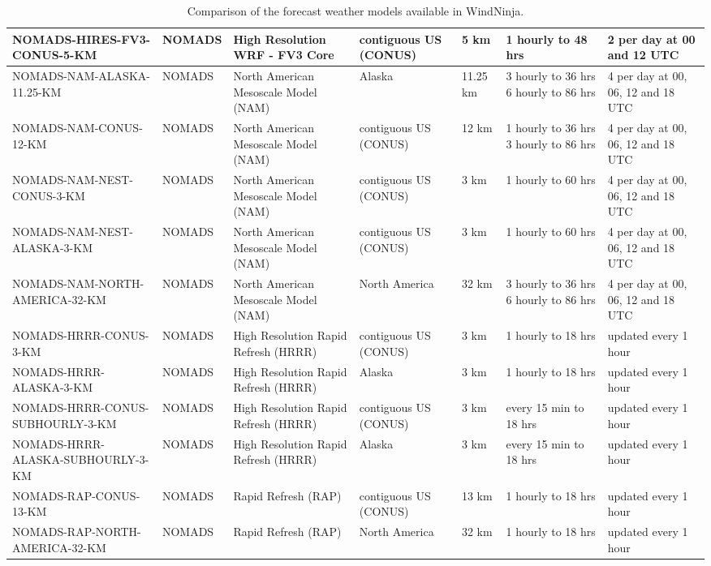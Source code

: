 \documentclass[12pt]{article}
\begin{document}
\begin{landscape}
\begin{table}
\begin{tabular}{|p{6.6cm}|p{1.3cm}|p{3.3cm}|p{2cm}|p{1.7cm}|p{2.8cm}|p{2.8cm}|}
\hline
NOMADS-HIRES-FV3-CONUS-5-KM & NOMADS & High Resolution WRF - FV3 Core & contiguous US (CONUS) & 5 km & 1 hourly to 48 hrs & 2 per day at 00 and 12 UTC\\
\hline
NOMADS-NAM-ALASKA-11.25-KM & NOMADS & North American Mesoscale Model (NAM) & Alaska & 11.25 km & 3 hourly to 36 hrs 6 hourly to 86 hrs & 4 per day at 00, 06, 12 and 18 UTC\\
\hline
NOMADS-NAM-CONUS-12-KM & NOMADS & North American Mesoscale Model (NAM) & contiguous US (CONUS) & 12 km & 1 hourly to 36 hrs 3 hourly to 86 hrs & 4 per day at 00, 06, 12 and 18 UTC\\
\hline
NOMADS-NAM-NEST-CONUS-3-KM & NOMADS & North American Mesoscale Model (NAM) & contiguous US (CONUS) & 3 km & 1 hourly to 60 hrs & 4 per day at 00, 06, 12 and 18 UTC\\
\hline
NOMADS-NAM-NEST-ALASKA-3-KM & NOMADS & North American Mesoscale Model (NAM) & contiguous US (CONUS) & 3 km & 1 hourly to 60 hrs & 4 per day at 00, 06, 12 and 18 UTC\\
\hline
NOMADS-NAM-NORTH-AMERICA-32-KM & NOMADS & North American Mesoscale Model (NAM) & North America & 32 km & 3 hourly to 36 hrs 6 hourly to 86 hrs & 4 per day at 00, 06, 12 and 18 UTC\\
\hline
NOMADS-HRRR-CONUS-3-KM & NOMADS & High Resolution Rapid Refresh (HRRR) & contiguous US (CONUS) & 3 km & 1 hourly to 18 hrs & updated every 1 hour\\
\hline
NOMADS-HRRR-ALASKA-3-KM & NOMADS & High Resolution Rapid Refresh (HRRR) & Alaska & 3 km & 1 hourly to 18 hrs & updated every 1 hour\\
\hline
NOMADS-HRRR-CONUS-SUBHOURLY-3-KM & NOMADS & High Resolution Rapid Refresh (HRRR) & contiguous US (CONUS) & 3 km & every 15 min to 18 hrs & updated every 1 hour\\
\hline
NOMADS-HRRR-ALASKA-SUBHOURLY-3-KM & NOMADS & High Resolution Rapid Refresh (HRRR) & Alaska & 3 km & every 15 min to 18 hrs & updated every 1 hour\\
\hline
NOMADS-RAP-CONUS-13-KM & NOMADS & Rapid Refresh (RAP) & contiguous US (CONUS) & 13 km & 1 hourly to 18 hrs & updated every 1 hour\\
\hline
NOMADS-RAP-NORTH-AMERICA-32-KM & NOMADS & Rapid Refresh (RAP) & North America & 32 km & 1 hourly to 18 hrs & updated every 1 hour\\
\hline
\end{tabular}
\caption{Comparison of the forecast weather models available in WindNinja.}
\end{table}
\end{landscape}
\end{document}
